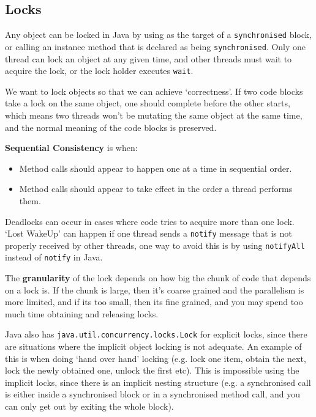 \subsection{Locks}

Any object can be locked in Java by using as the target of a
\texttt{synchronised} block, or calling an instance method that is declared as
being \texttt{synchronised}. Only one thread can lock an object at any given
time, and other threads must wait to acquire the lock, or the lock holder
executes \texttt{wait}.

We want to lock objects so that we can achieve `correctness'. If two code blocks
take a lock on the same object, one should complete before the other starts,
which means two threads won't be mutating the same object at the same time, and
the normal meaning of the code blocks is preserved.


\textbf{Sequential Consistency} is when:

\begin{itemize}
  \item Method calls should appear to happen one at a time in sequential order.
  \item Method calls should appear to take effect in the order a thread performs
  them.
\end{itemize}

Deadlocks can occur in cases where code tries to acquire more than one lock.
`Lost WakeUp' can happen if one thread sends a \texttt{notify} message that is
not properly received by other threads, one way to avoid this is by using
\texttt{notifyAll} instead of \texttt{notify} in Java.

The \textbf{granularity} of the lock depends on how big the chunk of code that
depends on a lock is. If the chunk is large, then it's coarse grained and the
parallelism is more limited, and if its too small, then its fine grained, and
you may spend too much time obtaining and releasing locks.

Java also has \texttt{java.util.concurrency.locks.Lock} for explicit locks,
since there are situations where the implicit object locking is not adequate. An
example of this is when doing `hand over hand' locking (e.g. lock one item,
obtain the next, lock the newly obtained one, unlock the first etc). This is
impossible using the implicit locks, since there is an implicit nesting structure
(e.g. a synchronised call is either inside a synchronised block or in a
synchronised method call, and you can only get out by exiting the whole block).

